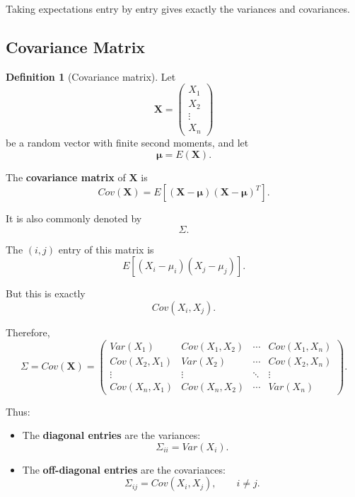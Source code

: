 \documentclass[11pt]{article}
\theoremstyle{definition}
\newtheorem{definition}{Definition}
\theoremstyle{plain}
\theoremstyle{remark}
\begin{document}
Taking expectations entry by entry gives exactly the variances and
covariances.


\subsection*{Covariance Matrix}

\begin{definition}[Covariance matrix]
Let
\[
\mathbf{X}
=
\begin{pmatrix}
X_1\\
X_2\\
\vdots\\
X_n
\end{pmatrix}
\]
be a random vector with finite second moments, and let
\[
\boldsymbol{\mu}=E(\mathbf{X}).
\]

The \textbf{covariance matrix} of $\mathbf{X}$ is
\[
{
Cov(\mathbf{X})
=
E\left[
(\mathbf{X}-\boldsymbol{\mu})
(\mathbf{X}-\boldsymbol{\mu})^T
\right].
}
\]

It is also commonly denoted by
\[
\Sigma.
\]
\end{definition}

The $(i,j)$ entry of this matrix is
\[
E\left[(X_i-\mu_i)(X_j-\mu_j)\right].
\]

But this is exactly
\[
Cov(X_i,X_j).
\]

Therefore,
\[
{
\Sigma
=
Cov(\mathbf{X})
=
\begin{pmatrix}
Var(X_1)
&
Cov(X_1,X_2)
&
\cdots
&
Cov(X_1,X_n)
\\
Cov(X_2,X_1)
&
Var(X_2)
&
\cdots
&
Cov(X_2,X_n)
\\
\vdots&\vdots&\ddots&\vdots\\
Cov(X_n,X_1)
&
Cov(X_n,X_2)
&
\cdots
&
Var(X_n)
\end{pmatrix}.
}
\]

Thus:

\begin{itemize}

\item The \textbf{diagonal entries} are the variances:
\[
\Sigma_{ii}=Var(X_i).
\]

\item The \textbf{off-diagonal entries} are the covariances:
\[
\Sigma_{ij}=Cov(X_i,X_j),
\qquad i\neq j.
\]

\end{itemize}
\end{document}
